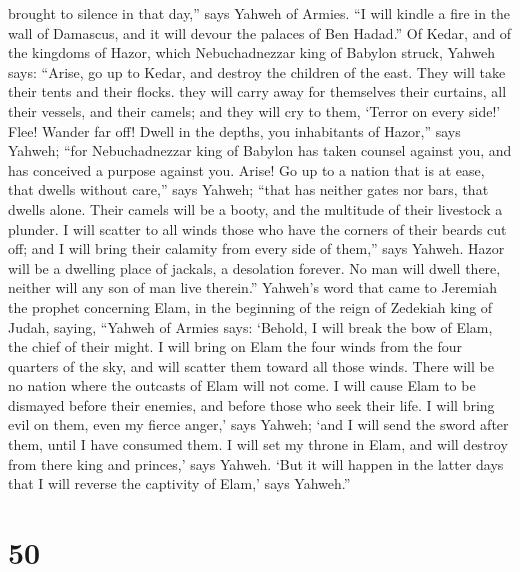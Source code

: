 brought to silence in that day,'' says Yahweh of Armies. 
``I will kindle a fire in the wall of Damascus, and it will devour the
palaces of Ben Hadad.''  Of Kedar, and of the kingdoms of
Hazor, which Nebuchadnezzar king of Babylon struck, Yahweh says:
``Arise, go up to Kedar, and destroy the children of the east.
 They will take their tents and their flocks. they will
carry away for themselves their curtains, all their vessels, and their
camels; and they will cry to them, `Terror on every side!' 
Flee! Wander far off! Dwell in the depths, you inhabitants of Hazor,''
says Yahweh; ``for Nebuchadnezzar king of Babylon has taken counsel
against you, and has conceived a purpose against you. 
Arise! Go up to a nation that is at ease, that dwells without care,''
says Yahweh; ``that has neither gates nor bars, that dwells alone.
 Their camels will be a booty, and the multitude of their
livestock a plunder. I will scatter to all winds those who have the
corners of their beards cut off; and I will bring their calamity from
every side of them,'' says Yahweh.  Hazor will be a
dwelling place of jackals, a desolation forever. No man will dwell
there, neither will any son of man live therein.'' 
Yahweh's word that came to Jeremiah the prophet concerning Elam, in the
beginning of the reign of Zedekiah king of Judah, saying, 
``Yahweh of Armies says: `Behold, I will break the bow of Elam, the
chief of their might.  I will bring on Elam the four winds
from the four quarters of the sky, and will scatter them toward all
those winds. There will be no nation where the outcasts of Elam will not
come.  I will cause Elam to be dismayed before their
enemies, and before those who seek their life. I will bring evil on
them, even my fierce anger,' says Yahweh; `and I will send the sword
after them, until I have consumed them.  I will set my
throne in Elam, and will destroy from there king and princes,' says
Yahweh.  `But it will happen in the latter days that I will
reverse the captivity of Elam,' says Yahweh.''

\hypertarget{section-49}{%
\section{50}\label{section-49}}

